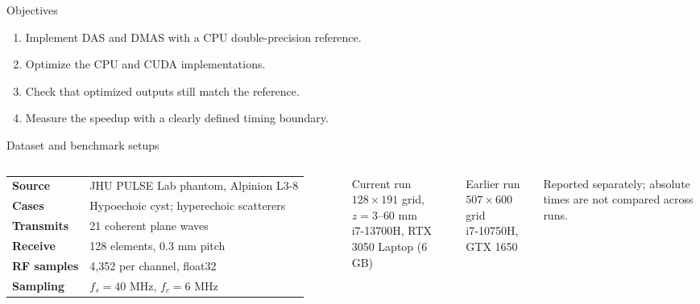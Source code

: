 \documentclass[aspectratio=169,10pt]{beamer}
\begin{document}
\begin{frame}{Objectives}
  \begin{enumerate}\setlength\itemsep{.8em}
    \item Implement DAS and DMAS with a CPU double-precision reference.
    \item Optimize the CPU and CUDA implementations.
    \item Check that optimized outputs still match the reference.
    \item Measure the speedup with a clearly defined timing boundary.
  \end{enumerate}
\end{frame}

\begin{frame}{Dataset and benchmark setups}
  \begin{columns}[T,onlytextwidth]
    \small
    \begin{tabularx}{\linewidth}{@{}>{\bfseries}p{2.2cm} X@{}}
      Source & JHU PULSE Lab phantom, Alpinion L3-8\\
      Cases & Hypoechoic cyst; hyperechoic scatterers\\
      Transmits & 21 coherent plane waves\\
      Receive & 128 elements, 0.3 mm pitch\\
      RF samples & 4,352 per channel, float32\\
      Sampling & $f_s=40$ MHz, $f_c=6$ MHz\\
    \end{tabularx}
    \small
    \begin{block}{Current run}
      $128\times191$ grid, $z=3$--$60$ mm\\
      i7-13700H, RTX 3050 Laptop (6 GB)
    \end{block}
    \begin{block}{Earlier run}
      $507\times600$ grid\\
      i7-10750H, GTX 1650
    \end{block}
    \scriptsize Reported separately; absolute times are not compared across runs.
  \end{columns}
\end{frame}
\end{document}
